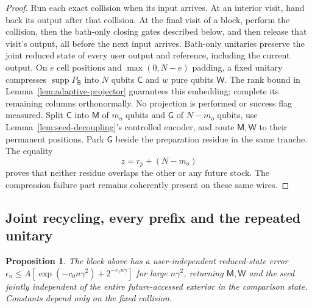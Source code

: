 \documentclass[11pt,a4paper]{article}
\numberwithin{equation}{section}
\theoremstyle{plain}
\newtheorem{proposition}[theorem]{Proposition}
\theoremstyle{definition}
\DeclareMathOperator{\supp}{supp}
\newcommand{\rg}[1]{\mathsf{#1}}
\begin{document}
\begin{proof}
Run each exact collision when its input arrives. At an interior visit,
hand back its output after that collision. At the final visit of a block,
perform the collision, then the bath-only closing gates described below,
and then release that visit's output, all before the next input arrives.
Bath-only unitaries preserve the joint reduced state of every user output
and reference, including the current output. On $e$ cell positions and
$\max(0,N-e)$ padding, a fixed
unitary compresses $\supp P_{\rg{B}}$ into $N$ qubits $\rg{C}$ and $w$ pure
qubits $\rg{W}$. The rank bound in Lemma~\ref{lem:adaptive-projector}
guarantees this embedding; complete its remaining columns orthonormally. No
projection is performed or success flag measured. Split $\rg{C}$ into $\rg{M}$
of $m_o$ qubits and $\rg{G}$ of $N-m_o$ qubits, use
Lemma~\ref{lem:seed-decoupling}'s controlled encoder, and route $\rg{M},\rg{W}$
to their permanent positions. Park $\rg{G}$ beside the preparation residue in
the same tranche. The equality
\begin{equation}
\label{eq:tranche-split}
z=r_p+(N-m_o)
\end{equation}
proves that neither residue overlaps the other or any future stock. The
compression failure part remains coherently present on these same wires.
\end{proof}

\subsection{Joint recycling, every prefix and the repeated unitary}

\begin{proposition}
\label{prop:joint-recycling}
The block above has a user-independent reduced-state error
$\epsilon_n\le A[\exp(-c_0n\gamma^2)+2^{-c_1n\gamma}]$ for large $n\gamma^2$,
returning $\rg{M},\rg{W}$ and the seed jointly independent of the entire
future-accessed exterior in the comparison state. Constants depend only on the
fixed collision.
\end{proposition}
\end{document}
